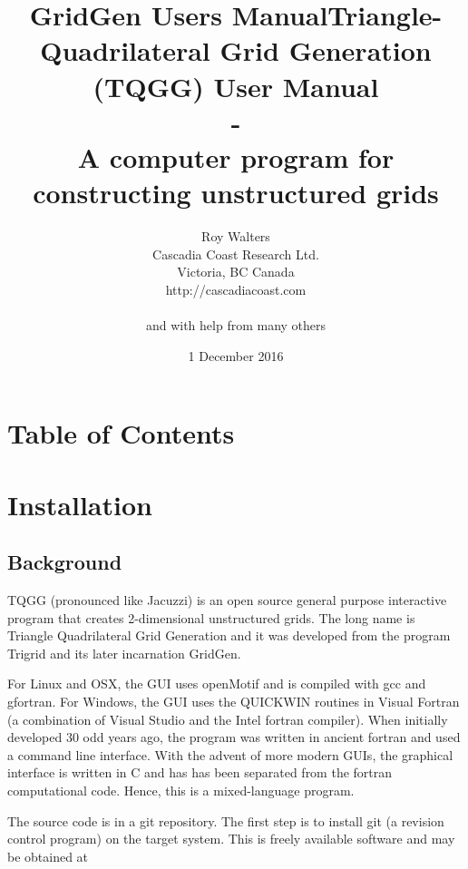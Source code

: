 \documentclass{article}
\title{GridGen Users Manual}
\begin{document}
\title{Triangle-Quadrilateral Grid Generation (TQGG) User Manual \\ - \\
 A computer program for constructing unstructured grids }

\author{Roy Walters \\
  Cascadia Coast Research Ltd. \\
  Victoria, BC Canada \\
  http://cascadiacoast.com \\ \\
  and with help from many others \\}

\date{ 1 December 2016}

\maketitle

\newpage
\section*{Table of Contents}

\setcounter{tocdepth}{2}
\tableofcontents


\newpage
\section{Installation}

\subsection{Background}
TQGG (pronounced like Jacuzzi) is an open source general purpose interactive program that creates
2-dimensional unstructured grids. The long name is Triangle Quadrilateral Grid Generation and it was
developed from the program Trigrid and its later incarnation GridGen.

For Linux and OSX, the GUI uses openMotif and is compiled with gcc and gfortran. 
For Windows, the GUI uses the QUICKWIN routines in Visual Fortran (a combination of
Visual Studio and the Intel fortran compiler). When initially developed 30 odd years 
ago, the program was written in ancient fortran and used a command line interface. With
the advent of more modern GUIs, the graphical interface is written in C and has has 
been separated from the fortran computational code. Hence, this is a mixed-language program.

The source code is in a git repository. The first step is to install git (a revision control program)
on the target system. This is freely available software and may be obtained at \\
\end{document}
